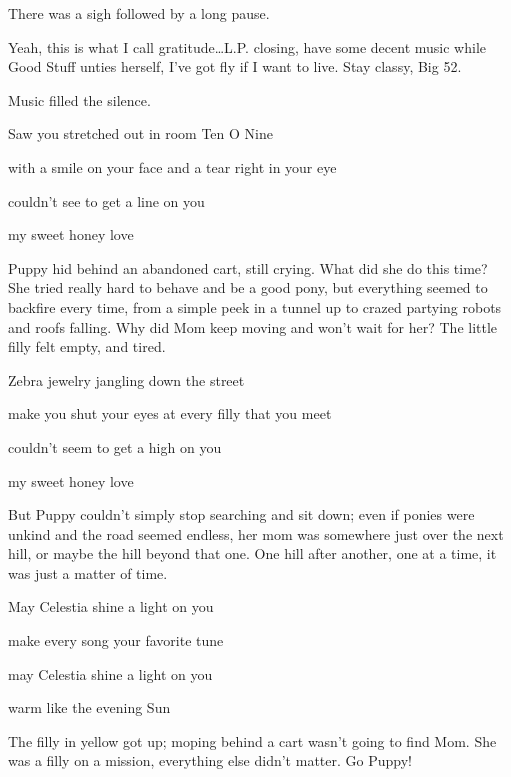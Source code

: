 There was a sigh followed by a long pause.

{\rt Yeah, this is what I call gratitude\dots L.P. closing, have some decent music while Good Stuff unties herself, I've got fly if I want to live. Stay classy, Big 52.}

Music filled the silence.

\begin{song}
    Saw you stretched out in room Ten O Nine

    with a smile on your face and a tear right in your eye

    couldn't see to get a line on you

    my sweet honey love
\end{song}

Puppy hid behind an abandoned cart, still crying. What did she do this time? She tried really hard to behave and be a good pony, but everything seemed to backfire every time, from a simple peek in a tunnel up to crazed partying robots and roofs falling. Why did Mom keep moving and won't wait for her? The little filly felt empty, and tired.


\begin{song}
Zebra jewelry jangling down the street

make you shut your eyes at every filly that you meet

couldn't seem to get a high on you

my sweet honey love
\end{song}

But Puppy couldn't simply stop searching and sit down; even if ponies were unkind and the road seemed endless, her mom was somewhere just over the next hill, or maybe the hill beyond that one. One hill after another, one at a time, it was just a matter of time.


\begin{song}
May Celestia shine a light on you

make every song your favorite tune

may Celestia shine a light on you

warm like the evening Sun
\end{song}

The filly in yellow got up; moping behind a cart wasn't going to find Mom. She was a filly on a mission, everything else didn't matter. Go Puppy!

\horizonline


